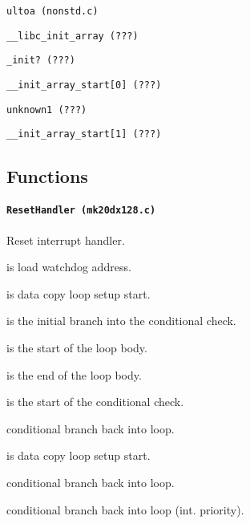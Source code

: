 \hspace{8mm} \texttt{ultoa (nonstd.c)}

\hspace{2mm} \texttt{\_\_libc\_init\_array (???)}

\hspace{4mm} \texttt{\_init? (???)}

\hspace{4mm} \texttt{\_\_init\_array\_start[0] (???)}

\hspace{6mm} \texttt{unknown1 (???)}

\hspace{4mm} \texttt{\_\_init\_array\_start[1] (???)}

\subsection{Functions}

\paragraph{\texttt{ResetHandler (mk20dx128.c)}} Reset interrupt handler.

 is load watchdog address.

\vspace{1em}

 is data copy loop setup start.

 is the initial branch into the conditional check.

 is the start of the loop body.

 is the end of the loop body.

 is the start of the conditional check.

 conditional branch back into loop.

\vspace{1em}

 is data copy loop setup start.

 conditional branch back into loop.

\vspace{1em}

 conditional branch back into loop (int. priority).

\vspace{1em}

